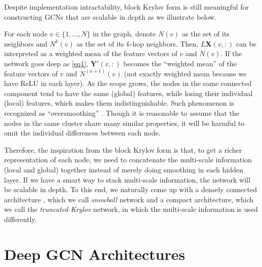 \documentclass{article}
\begin{document}
Despite implementation intractability, block Krylov form is still meaningful for constructing GCNs that are scalable in depth as we illustrate below.

For each node $v\in \{1,\ldots,N\}$ in the graph, denote $N(v)$ as the set of its neighbors and $N^k(v)$ as the set of its $k$-hop neighbors. Then, $L \bm{X}(v,:)$ can be interpreted as a weighted mean of the feature vectors of $v$ and $N(v)$. If the network goes deep as \eqref{eq1}, $\bm{Y}'(v,:)$ becomes the ``weighted mean'' of the feature vectors of
$v$ and $N^{(n+1)}(v)$ (not exactly weighted mean because we have ReLU in each layer). As the scope grows, the nodes in the same connected component tend to have the same (global) features, while losing their individual (local) features, which makes them indistinguishable. Such phenomenon is recognized as ``oversmoothing'' \cite{li2018deeper}. Though it is reasonable to assume that the nodes in the same cluster share many similar properties, it will be harmful to omit the individual differences between each node.

Therefore, the inspiration from the block Krylov form is that, to get a richer representation of each node, we need to concatenate the multi-scale information (local and global) together instead of merely doing smoothing in each hidden layer. If we have a smart way to stack multi-scale information, the network will be scalable in depth. To this end, we naturally come up with a densely connected architecture \cite{huang2017densely}, which we call \textit{snowball} network and a compact architecture, which we call the \textit{truncated Krylov} network, in which the multi-scale information is used differently.

\section{Deep GCN Architectures}
\label{deep}
\end{document}
